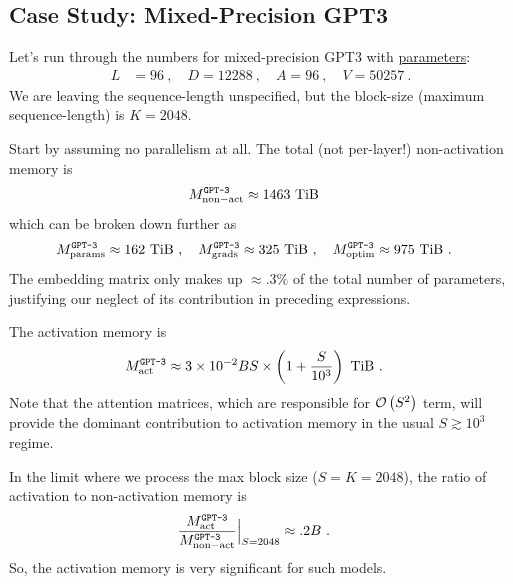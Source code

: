 \documentclass[11pt]{article}
\begin{document}
\subsection{Case Study: Mixed-Precision GPT3 \label{subsec_gpt_mem_study} }

Let's run through the numbers for mixed-precision GPT3 with
\href{https://bmk.sh/2020/05/29/GPT-3-A-Brief-Summary/}{parameters}:
\begin{align}
	L & = 96 \ , \quad
	D = 12288 \ ,\quad
	A = 96\ , \quad V = 50257\ .
	\label{eq_gpt_num}
\end{align}
We are leaving the sequence-length unspecified, but the block-size (maximum sequence-length) is $
	K=2048 $.


Start by assuming no parallelism at all. The total (not per-layer!) non-activation memory is
\begin{align}
	M _{ {\rm non-act}  } ^ \texttt{GPT-3} & \approx 1463\ {\rm TiB}
\end{align}
which can be broken down further as
\begin{align}
	M _{ {\rm params}  } ^ \texttt{GPT-3} & \approx 162\ {\rm TiB} \ , \quad
	M _{ {\rm grads}  } ^ \texttt{GPT-3}  \approx 325\ {\rm TiB}\ , \quad
	M _{ {\rm optim}  } ^ \texttt{GPT-3}  \approx 975\ {\rm TiB}\ .
\end{align}
The embedding matrix only makes up $ \approx .3\% $ of the total number of parameters, justifying our
neglect of its contribution in preceding expressions.


The activation memory is
\begin{align}
	M _{ {\rm act}  } ^ \texttt{GPT-3} & \approx 3 \times 10 ^{ -2 }BS\times  \left (  1  + \frac{ S
	}{ 10 ^{ 3 } } \right ) \ {\rm TiB} \ .
\end{align}
Note that the attention matrices, which are responsible for $ \mathcal{O} \left( S ^{ 2 } \right)  $ term, will
provide the dominant contribution to activation memory in the usual $ S \gtrsim 10 ^{ 3 } $ regime.

In the limit where we process the max block size ($ S=K=2048 $), the ratio of activation to
non-activation memory is
\begin{align}
	\frac{  M _{ {\rm act}  } ^ \texttt{GPT-3}}{ M _{ {\rm non-act}  } ^ \texttt{GPT-3} }\Big| _{
	S=2048 } & \approx  .2 B \ .
\end{align}
So, the activation memory is very significant for such models.
\end{document}
